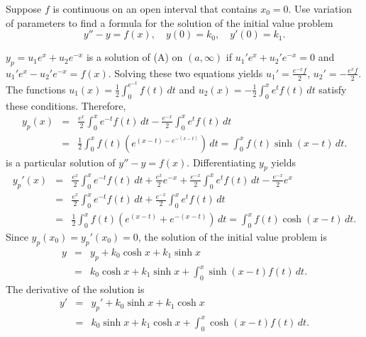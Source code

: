 \documentclass{ximera}
\begin{document}
\begin{problem}\label{exer:5.7.38}
Suppose $f$ is continuous on an open interval
that contains $x_0=0$.
Use variation of parameters to
find a formula for the solution of the initial value problem
$$
y''-y=f(x), \quad  y(0)=k_0,\quad y'(0)=k_1.
$$

\begin{solution}
    $y_p=u_1e^x+u_2e^{-x}$ is a solution of (A) on
$(a,\infty)$ if $u_1'e^x+u_2'e^{-x}=0$ and $u_1'e^x-u_2'e^{-x}
=f(x)$. Solving these two equations yields
$u_1'=\frac{e^{-x}f}{2}$,
$u_2'=-\frac{e^xf}{2}$. The functions
$u_1(x)=\frac{1}{2}\int_0^{e^{-t}}f(t)\,dt$
and $u_2(x)=-\frac{1}{2}\int_0^xe^tf(t)\,dt$ satisfy
these conditions. Therefore,
\begin{eqnarray*}
y_p(x)&=&\frac{e^x}{2}\int_0^xe^{-t}f(t)\,dt
-\frac{e^{-x}}{2}\int_0^xe^tf(t)\,dt \\
&=&\frac{1}{2}\int_0^xf(t)\left(e^{(x-t)-e^{-(x-t)}}\right)\,dt
=\int_0^x f(t)\sinh(x-t)\,dt.
\end{eqnarray*}
is a particular solution of $y''-y=f(x)$. Differentiating
$y_p$ yields
\begin{eqnarray*}
y_p'(x)&=&\frac{e^x}{2}\int_0^xe^{-t}f(t)\,dt+\frac{e^{x}}{2}e^{-x}
+\frac{e^{-x}}{2}\int_0^xe^tf(t)\,dt-\frac{e^{-x}}{2}e^x\\
&=&\frac{e^x}{2}\int_0^xe^{-t}f(t)\,dt
+\frac{e^{-x}}{2}\int_0^xe^tf(t)\,dt\\
&=&\frac{1}{2}\int_0^xf(t)\left(e^{(x-t)}+e^{-(x-t)}\right)\,dt
=\int_0^x f(t)\cosh(x-t)\,dt.
\end{eqnarray*}
Since $y_p(x_0)=y_p'(x_0)=0$, the solution of the initial value
problem is
\begin{eqnarray*}
y&=&y_p+k_0\cosh x+k_1\sinh x\\
&=&k_0\cosh x+k_1\sinh x+\int_0^x\sinh (x-t)f(t)\,dt.
\end{eqnarray*}
The derivative of the solution is
\begin{eqnarray*}
y'&=&y_p'+k_0\sinh x+k_1\cosh x\\
&=&k_0\sinh x+k_1\cosh x+\int_0^x\cosh (x-t) f(t)\,dt.
\end{eqnarray*}
\end{solution}
\end{problem}
\end{document}
